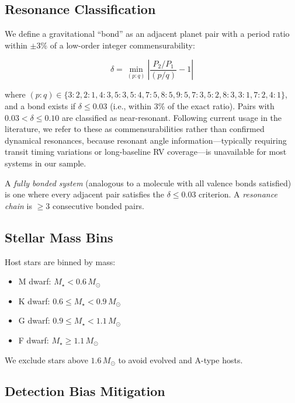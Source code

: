 \documentclass[twocolumn]{aastex631}
\begin{document}
\subsection{Resonance Classification}

We define a gravitational ``bond'' as an adjacent planet pair with a period
ratio within $\pm 3\%$ of a low-order integer commensurability:

\begin{equation}
  \delta = \min_{(p:q)}\left|\frac{P_2/P_1}{(p/q)} - 1\right|
\end{equation}

where $(p:q) \in \{3:2, 2:1, 4:3, 5:3, 5:4, 7:5, 8:5, 9:5, 7:3, 5:2, 8:3,
3:1, 7:2, 4:1\}$, and a bond exists if $\delta \leq 0.03$ (i.e., within
3\% of the exact ratio). Pairs with $0.03 < \delta \leq 0.10$ are classified as
near-resonant. Following current usage in the literature\citep{mills2016,luger2017},
we refer to these as commensurabilities rather than confirmed dynamical
resonances, because resonant angle information---typically requiring transit
timing variations or long-baseline RV coverage---is unavailable for most
systems in our sample.

A \textit{fully bonded system} (analogous to a molecule with all valence bonds
satisfied) is one where every adjacent pair satisfies the $\delta \leq 0.03$
criterion. A \textit{resonance chain} is $\geq 3$ consecutive bonded pairs.

\subsection{Stellar Mass Bins}

Host stars are binned by mass:
\begin{itemize}
  \item M dwarf: $M_\star < 0.6\,M_\odot$
  \item K dwarf: $0.6 \leq M_\star < 0.9\,M_\odot$
  \item G dwarf: $0.9 \leq M_\star < 1.1\,M_\odot$
  \item F dwarf: $M_\star \geq 1.1\,M_\odot$
\end{itemize}

We exclude stars above $1.6\,M_\odot$ to avoid evolved and A-type hosts.

\subsection{Detection Bias Mitigation}
\end{document}
